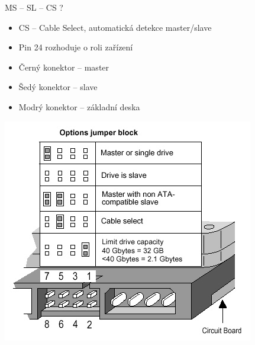 \documentclass[aspectratio=43]{beamer}
\begin{document}
\begin{frame}{MS – SL – CS ?}
	\begin{itemize}
		\item CS – Cable Select, automatická detekce master/slave
		\item Pin 24 rozhoduje o roli zařízení
		\item Černý konektor – master
		\item Šedý konektor – slave
		\item Modrý konektor – základní deska
	\end{itemize}
	\begin{center}
		\includegraphics[width=0.55\linewidth]{extrahovane_obrazky/ide_j.jpg}
	\end{center}
\end{frame}
\end{document}
